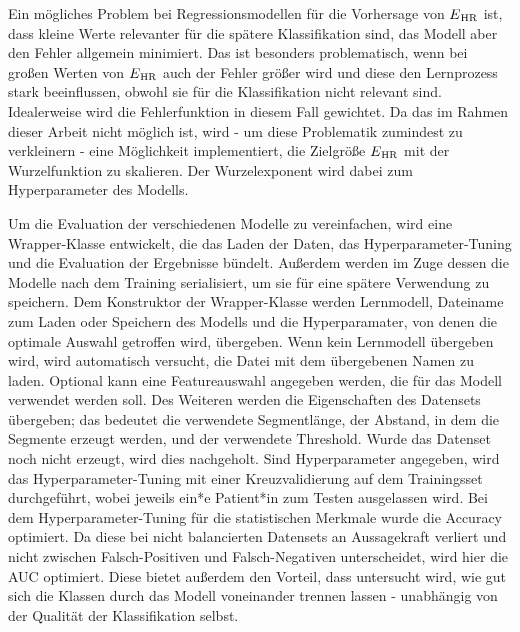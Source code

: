 Ein mögliches Problem bei Regressionsmodellen für die Vorhersage von $E\textsubscript{HR}$ ist, dass kleine Werte relevanter für die spätere Klassifikation sind, das Modell aber den Fehler allgemein minimiert. Das ist besonders problematisch, wenn bei großen Werten von $E\textsubscript{HR}$ auch der Fehler größer wird und diese den Lernprozess stark beeinflussen, obwohl sie für die Klassifikation nicht relevant sind. Idealerweise wird die Fehlerfunktion in diesem Fall gewichtet. Da das im Rahmen dieser Arbeit nicht möglich ist, wird - um diese Problematik zumindest zu verkleinern - eine Möglichkeit implementiert, die Zielgröße $E\textsubscript{HR}$ mit der Wurzelfunktion zu skalieren. Der Wurzelexponent wird dabei zum Hyperparameter des Modells.


Um die Evaluation der verschiedenen Modelle zu vereinfachen, wird eine Wrapper-Klasse entwickelt, die das Laden der Daten, das Hyperparameter-Tuning und die Evaluation der Ergebnisse bündelt. Außerdem werden im Zuge dessen die Modelle nach dem Training serialisiert, um sie für eine spätere Verwendung zu speichern. Dem Konstruktor der Wrapper-Klasse werden Lernmodell, Dateiname zum Laden oder Speichern des Modells und die Hyperparamater, von denen die optimale Auswahl getroffen wird, übergeben. Wenn kein Lernmodell übergeben wird, wird automatisch versucht, die Datei mit dem übergebenen Namen zu laden. Optional kann eine Featureauswahl angegeben werden, die für das Modell verwendet werden soll. Des Weiteren werden die Eigenschaften des Datensets übergeben; das bedeutet die verwendete Segmentlänge, der Abstand, in dem die Segmente erzeugt werden, und der verwendete Threshold. Wurde das Datenset noch nicht erzeugt, wird dies nachgeholt. Sind Hyperparameter angegeben, wird das Hyperparameter-Tuning mit einer Kreuzvalidierung auf dem Trainingsset durchgeführt, wobei jeweils ein*e Patient*in zum Testen ausgelassen wird. Bei dem Hyperparameter-Tuning für die statistischen Merkmale wurde die Accuracy optimiert. Da diese bei nicht balancierten Datensets an Aussagekraft verliert und nicht zwischen Falsch-Positiven und Falsch-Negativen unterscheidet, wird hier die \ac{AUC} optimiert. Diese bietet außerdem den Vorteil, dass untersucht wird, wie gut sich die Klassen durch das Modell voneinander trennen lassen - unabhängig von der Qualität der Klassifikation selbst.


